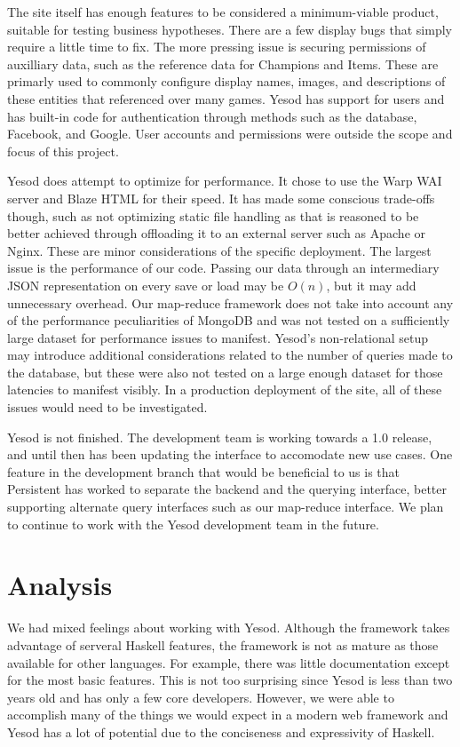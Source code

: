 \documentclass[letterpaper,twocolumn,9pt]{article}
\begin{document}
The site itself has enough features to be considered a minimum-viable product, suitable for testing business hypotheses.  There are a few display bugs that simply require a little time to fix.  The more pressing issue is securing permissions of auxilliary data, such as the reference data for Champions and Items.  These are primarly used to commonly configure display names, images, and descriptions of these entities that referenced over many games.  Yesod has support for users and has built-in code for authentication through methods such as the database, Facebook, and Google.  User accounts and permissions were outside the scope and focus of this project.

Yesod does attempt to optimize for performance.  It chose to use the Warp WAI server and Blaze HTML for their speed.  It has made some conscious trade-offs though, such as not optimizing static file handling as that is reasoned to be better achieved through offloading it to an external server such as Apache or Nginx.  These are minor considerations of the specific deployment.  The largest issue is the performance of our code.  Passing our data through an intermediary JSON representation on every save or load may be $O(n)$, but it may add unnecessary overhead.  Our map-reduce framework does not take into account any of the performance peculiarities of MongoDB and was not tested on a sufficiently large dataset for performance issues to manifest.  Yesod's non-relational setup may introduce additional considerations related to the number of queries made to the database, but these were also not tested on a large enough dataset for those latencies to manifest visibly.  In a production deployment of the site, all of these issues would need to be investigated.

Yesod is not finished.  The development team is working towards a 1.0 release, and until then has been updating the interface to accomodate new use cases.  One feature in the development branch that would be beneficial to us is that Persistent has worked to separate the backend and the querying interface, better supporting alternate query interfaces such as our map-reduce interface.  We plan to continue to work with the Yesod development team in the future.

\section{Analysis}
\label{analysis}

We had mixed feelings about working with Yesod. Although the framework takes advantage of serveral Haskell features, the framework is not as mature as those available for other languages. For example, there was little documentation except for the most basic features. This is not too surprising since Yesod is less than two years old and has only a few core developers.  However, we were able to accomplish many of the things we would expect in a modern web framework and Yesod has a lot of potential due to the conciseness and expressivity of Haskell.
\end{document}
